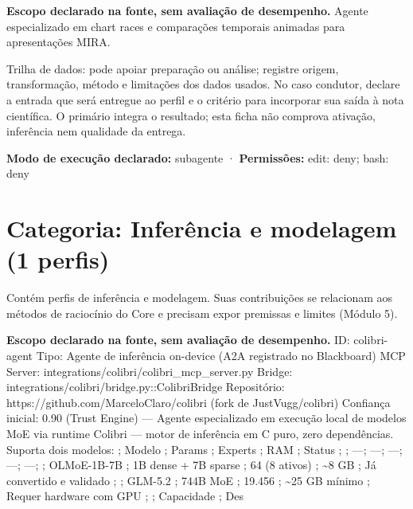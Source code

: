 
\begin{descricao}
\textbf{Escopo declarado na fonte, sem avaliação de desempenho.}
Agente especializado em chart races e comparações temporais animadas para apresentações MIRA.
\end{descricao}

\begin{funcao}
Trilha de dados: pode apoiar preparação ou análise; registre origem, transformação, método e limitações dos dados usados. No caso condutor, declare a entrada que será entregue ao perfil e o critério para incorporar sua saída à nota científica. O primário integra o resultado; esta ficha não comprova ativação, inferência nem qualidade da entrega.
\end{funcao}

\begin{arquitetura}
\textbf{Modo de execução declarado:} subagente · \textbf{Permissões:} edit: deny; bash: deny
\end{arquitetura}

\clearpage
\section{Categoria: Inferência e modelagem (1 perfis)}

\begin{descricao}
Contém perfis de inferência e modelagem. Suas contribuições se relacionam aos métodos de raciocínio do Core e precisam expor premissas e limites (Módulo 5).
\end{descricao}


\begin{descricao}
\textbf{Escopo declarado na fonte, sem avaliação de desempenho.}
ID: colibri-agent Tipo: Agente de inferência on-device (A2A registrado no Blackboard) MCP Server: integrations/colibri/colibri\_mcp\_server.py Bridge: integrations/colibri/bridge.py::ColibriBridge Repositório: https://github.com/MarceloClaro/colibri (fork de JustVugg/colibri) Confiança inicial: 0.90 (Trust Engine) --- Agente especializado em execução local de modelos MoE via runtime Colibri — motor de inferência em C puro, zero dependências. Suporta dois modelos: ; Modelo ; Params ; Experts ; RAM ; Status ; ; ---; ---; ---; ---; ---; ; OLMoE-1B-7B ; 1B dense + 7B sparse ; 64 (8 ativos) ; \~{}8 GB ; Já convertido e validado ; ; GLM-5.2 ; 744B MoE ; 19.456 ; \~{}25 GB mínimo ; Requer hardware com GPU ; ; Capacidade ; Des
\end{descricao}


